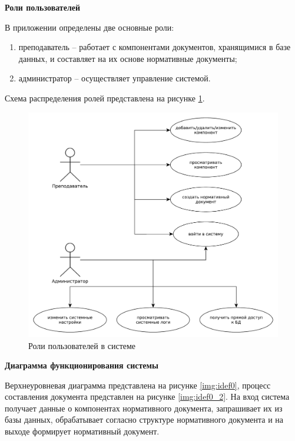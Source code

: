 \clearpage

\noindent\textbf{Роли пользователей}

В приложении определены две основные роли: 
\begin{enumerate}
	\item преподаватель -- работает с компонентами документов, хранящимися в базе данных, и составляет на их основе нормативные документы;
	\item администратор -- осуществляет управление системой.
\end{enumerate}
Схема распределения ролей представлена на рисунке \ref{img:usecase}.

\begin{figure}[h!]
	\begin{center}
		\includegraphics[scale=0.4]{inc/img/use_case}
	\end{center}
	\captionsetup{justification=centering}
	\caption{Роли пользователей в системе}
	\label{img:usecase}
\end{figure}

\noindent\textbf{Диаграмма функционирования системы}

Верхнеуровневая диаграмма представлена на рисунке \ref{img:idef0}, процесс составления документа представлен на рисунке \ref{img:idef0_2}. На вход система получает данные о компонентах нормативного документа, запрашивает их из базы данных, обрабатывает согласно структуре нормативного документа и на выходе формирует нормативный документ.

